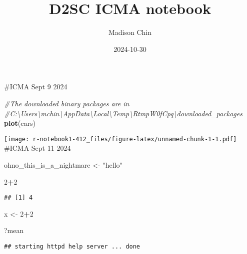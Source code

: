 \documentclass[
]{article}
\title{D2SC ICMA notebook}
\author{Madison Chin}
\date{2024-10-30}
\newenvironment{Shaded}{\begin{snugshade}}{\end{snugshade}}
\newcommand{\CommentTok}[1]{\textcolor[rgb]{0.56,0.35,0.01}{\textit{#1}}}
\newcommand{\DecValTok}[1]{\textcolor[rgb]{0.00,0.00,0.81}{#1}}
\newcommand{\FunctionTok}[1]{\textcolor[rgb]{0.13,0.29,0.53}{\textbf{#1}}}
\newcommand{\NormalTok}[1]{#1}
\newcommand{\OtherTok}[1]{\textcolor[rgb]{0.56,0.35,0.01}{#1}}
\newcommand{\SpecialCharTok}[1]{\textcolor[rgb]{0.81,0.36,0.00}{\textbf{#1}}}
\newcommand{\StringTok}[1]{\textcolor[rgb]{0.31,0.60,0.02}{#1}}
\begin{document}
\maketitle

{
\setcounter{tocdepth}{2}
\tableofcontents
}
\#ICMA Sept 9 2024

\begin{Shaded}
\begin{Highlighting}[]
\CommentTok{\#The downloaded binary packages are in}
\CommentTok{\#C:\textbackslash{}Users\textbackslash{}mchin\textbackslash{}AppData\textbackslash{}Local\textbackslash{}Temp\textbackslash{}RtmpW0fCpq\textbackslash{}downloaded\_packages}
\FunctionTok{plot}\NormalTok{(cars)}
\end{Highlighting}
\end{Shaded}

\texttt{[image: r-notebook1-412\_files/figure-latex/unnamed-chunk-1-1.pdf]}
\#ICMA Sept 11 2024

\begin{Shaded}
\begin{Highlighting}[]
\NormalTok{ohno\_this\_is\_a\_nightmare }\OtherTok{\textless{}{-}} \StringTok{"hello"}
\end{Highlighting}
\end{Shaded}

\begin{Shaded}
\begin{Highlighting}[]
\DecValTok{2}\SpecialCharTok{+}\DecValTok{2}
\end{Highlighting}
\end{Shaded}

\begin{verbatim}
## [1] 4
\end{verbatim}

\begin{Shaded}
\begin{Highlighting}[]
\NormalTok{x }\OtherTok{\textless{}{-}} \DecValTok{2}\SpecialCharTok{+}\DecValTok{2}
\end{Highlighting}
\end{Shaded}

\begin{Shaded}
\begin{Highlighting}[]
\NormalTok{?mean}
\end{Highlighting}
\end{Shaded}

\begin{verbatim}
## starting httpd help server ... done
\end{verbatim}
\end{document}
